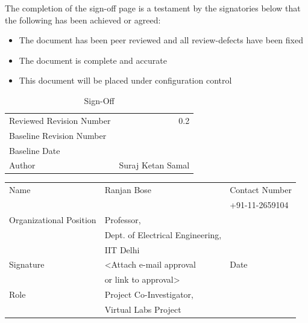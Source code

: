 \documentclass[11pt]{article}
\begin{document}
The completion of the sign-off page is a testament by the signatories
below that the following has been achieved or agreed:
\begin{itemize}
\item The document has been peer reviewed and all review-defects have been fixed
\item The document is complete and accurate
\item This document will be placed under configuration control
\end{itemize}
\begin{table}[H]
\caption{\label{tbl: Sign-Off}Sign-Off}
\begin{center}
\begin{tabular}{lr}
\hline
 Reviewed Revision Number  &                0.2  \\
 Baseline Revision Number  &                     \\
 Baseline Date             &                     \\
 Author                    &  Suraj Ketan Samal  \\
\hline
\end{tabular}
\end{center}
\end{table}

                        


\begin{center}
\begin{tabular}{lll}
\hline
 Name                     &  Ranjan Bose                       &  Contact Number  \\
                          &                                    &  +91-11-2659104  \\
 Organizational Position  &  Professor,                        &                  \\
                          &  Dept. of Electrical Engineering,  &                  \\
                          &  IIT Delhi                         &                  \\
 Signature                &  <Attach e-mail approval           &  Date            \\
                          &  or link to approval>              &                  \\
 Role                     &  Project Co-Investigator,          &                  \\
                          &  Virtual Labs Project              &                  \\
\hline
\end{tabular}
\end{center}
\end{document}
